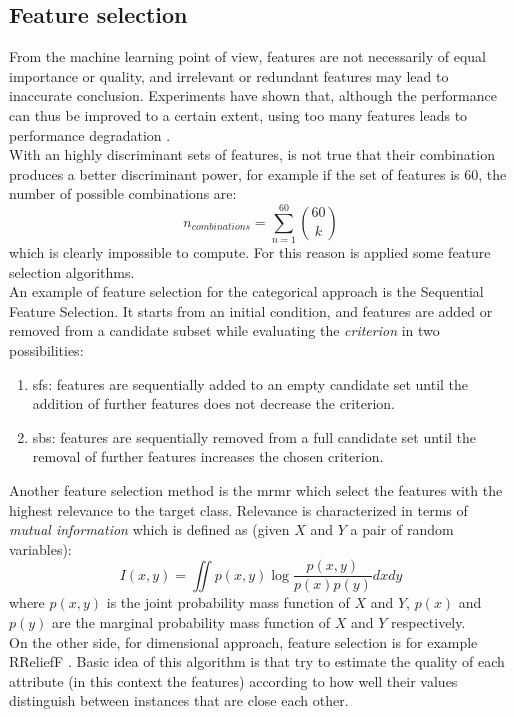 \subsection{Feature selection}\label{feature_selection}
From the machine learning point of view, features are not necessarily of equal importance or quality, and irrelevant or redundant features may lead to inaccurate conclusion. Experiments have shown that, although the performance can thus be improved to a certain extent, using too many features leads to performance degradation \cite{zhang2017feature}.
\\
With an highly discriminant sets of features, is not true that their combination produces a better discriminant power, for example if the set of features is 60, the number of possible combinations are:
\begin{equation}
	n_{combinations} = \sum_{n=1}^{60} \binom{60}{k}
\end{equation}
which is clearly impossible to compute. For this reason is applied some feature selection algorithms.
\\ \indent
An example of feature selection for the categorical approach is the Sequential Feature Selection. It starts from an initial condition, and features are added or removed from a candidate subset while evaluating the \textit{criterion} in two possibilities:
\begin{enumerate}
	\item \gls{sfs}: features are sequentially added to an empty candidate set until the addition of further features does not decrease the criterion.
	\item \gls{sbs}: features are sequentially removed from a full candidate set until the removal of further features increases the chosen criterion.
\end{enumerate}
Another feature selection method is the \gls{mrmr} which select the features with the highest relevance to the target class. Relevance is characterized in terms of \textit{mutual information} which is defined as (given $X$ and $Y$ a pair of random variables):
\begin{equation}
	I(x,y)=\iint p(x,y) \log\dfrac{p(x,y)}{p(x)p(y)} dxdy
\end{equation}
where $p(x,y)$ is the joint probability mass function of $X$ and $Y$, $p(x)$ and $p(y)$ are the marginal probability mass function of $X$ and $Y$ respectively.
\\ \indent
On the other side, for dimensional approach, feature selection is for example RReliefF \cite{robnik2003theoretical}. Basic idea of this algorithm is that try to estimate the quality of each attribute (in this context the features) according to how well their values distinguish between instances that are close each other.
